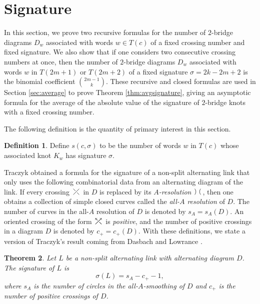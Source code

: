\documentclass[12pt]{amsart}
\newtheorem{theorem}{Theorem}[section]
\theoremstyle{definition}
\newtheorem{definition}[theorem]{Definition}
\theoremstyle{remark}
\numberwithin{equation}{section}
\newcommand{\crosspos}{
\begin{tikzpicture}[baseline=-2]
\draw[white,line width=1.5pt,double=black,double distance=.5pt] (0,0.2) -- (0.3,-0.1);
\draw[white,line width=1.5pt,double=black,double distance=.5pt] (0,-0.1) -- (0.3,0.2);
\end{tikzpicture}}
\newcommand{\crossposor}{
\begin{tikzpicture}[baseline=-2]
\draw[white,line width=1.5pt,double=black,double distance=.5pt] (0,0.2) -- (0.3,-0.1);
\draw[<-] (0,0.2) -- (0.3,-0.1);
\draw[white,line width=1.5pt,double=black,double distance=.5pt] (0,-0.1) -- (0.3,0.2);
\draw[->] (0,-0.1) -- (0.3,0.2);
\end{tikzpicture}}
\newcommand{\crosssmooth}{
\begin{tikzpicture}[baseline=-2]
\draw[white,line width=1.5pt,double=black,double distance=.5pt, rounded corners] (0,0.2) -- (.1,.05) -- (0,-0.1);
\draw[white,line width=1.5pt,double=black,double distance=.5pt, rounded corners] (0.3,-0.1) -- (.2,.05) -- (0.3,0.2);
\end{tikzpicture}}
\begin{document}
\section{Signature}
\label{sec:signature}

In this section, we prove two recursive formulas for the number of $2$-bridge diagrams $D_w$ associated with words $w\in T(c)$ of a fixed crossing number and fixed signature. We also show that if one considers two consecutive crossing numbers at once, then the number of $2$-bridge diagrams $D_w$ associated with words $w$ in $T(2m+1)$ or $T(2m+2)$ of a fixed signature $\sigma=2k-2m+2$ is the binomial coefficient $\binom{2m-1}{k}$. These recursive and closed formulas are used in Section \ref{sec:average} to prove Theorem \ref{thm:avgsignature}, giving an asymptotic formula for the average of the absolute value of the signature of $2$-bridge knots with a fixed crossing number.

The following definition is the quantity of primary interest in this section.
\begin{definition}
    \label{def:s(c,sig)}
    Define $s(c,\sigma)$ to be the number of words $w$ in $T(c)$ whose associated knot $K_w$ has signature $\sigma$. 
\end{definition}

Traczyk \cite{Tra} obtained a formula for the signature of a non-split alternating link that only uses the following combinatorial data from an alternating diagram of the link. If every crossing $\crosspos$ in $D$ is replaced by its \textit{$A$-resolution} $\crosssmooth$, then one obtains a collection of simple closed curves called the \textit{all-$A$ resolution} of $D$. The number of curves in the all-$A$ resolution of $D$ is denoted by $s_A=s_A(D)$. An oriented crossing of the form $\crossposor$ is \textit{positive}, and the number of positive crossings in a diagram $D$ is denoted by $c_+=c_+(D)$. With these definitions, we state a version of Traczyk's result coming from Dasbach and Lowrance \cite{DasLow:sig}.
\begin{theorem}
\label{thm:Tra}
\cite{Tra}
Let $L$ be a non-split alternating link with alternating diagram $D$. 
The signature of $L$ is
\begin{equation}
\sigma(L)=s_A-c_+-1,
\end{equation}
where $s_A$ is the number of circles in the all-$A$-smoothing of $D$ and $c_+$ is the number of positive crossings of  $D$.
\end{theorem}
\end{document}
